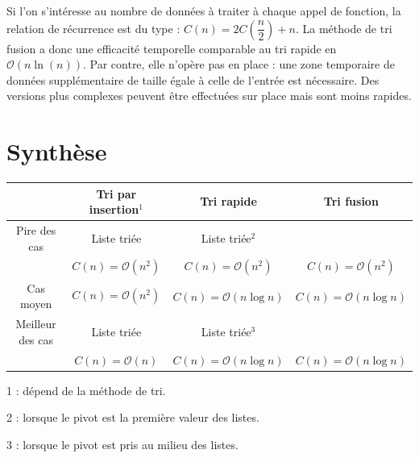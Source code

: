 \documentclass[10pt,fleqn]{article} %
\begin{document}
Si l'on s'intéresse au nombre de données à traiter à chaque appel de fonction, la relation de récurrence est du type :
$C(n) = 2 C\left(\dfrac{n}{2}\right)  +  n$.
La méthode de tri fusion a donc une efficacité temporelle comparable au tri rapide en $\mathcal{O}\left(n \ln(n)\right)$. Par contre, elle n'opère pas en place : une zone temporaire de données supplémentaire de taille égale à celle de l'entrée est nécessaire. Des versions plus complexes peuvent être effectuées sur place mais sont moins rapides.










\section{Synthèse}

\begin{center}
\begin{tabular}{|c|c|c|c|}
\hline
& Tri par insertion$^1$ & Tri rapide & Tri fusion \\
\hline 
{Pire des cas} &  Liste triée& Liste triée$^2$ & \\ 
&  $ C(n)=\mathcal{O}\left(n^2 \right)$ & $ C(n)=\mathcal{O}\left(n^2 \right)$ & $ C(n)=\mathcal{O}\left(n^2\right)$ \\ \hline
Cas moyen & $ C(n)=\mathcal{O}\left(n^2 \right)$ &$ C(n)=\mathcal{O}\left(n \log n\right)$  & $ C(n)=\mathcal{O}\left(n \log n\right)$ \\ \hline
Meilleur des cas  & Liste triée & Liste triée$^3$ & \\ 
  & $ C(n)=\mathcal{O}\left(n \right)$ & $ C(n)=\mathcal{O}\left(n \log n \right)$ & $ C(n)=\mathcal{O}\left(n \log n\right)$ \\ \hline
\end{tabular}
\end{center}

\footnotesize{1 : dépend de la méthode de tri.}

\footnotesize{2 : lorsque le pivot est la première valeur des listes.}

\footnotesize{3 : lorsque le pivot est pris au milieu des listes.}
\begin{thebibliography}{2}

\end{thebibliography}
\end{document}
